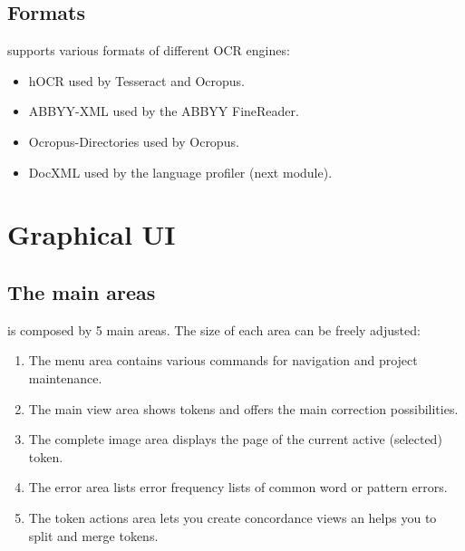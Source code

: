 \subsection{Formats}
\begin{frame}
	\pocoto{} supports various formats of different OCR engines:
	\begin{itemize}
		\item hOCR used by Tesseract and Ocropus.
		\item ABBYY-XML used by the ABBYY FineReader.
		\item Ocropus-Directories used by Ocropus.
		\item DocXML used by the language profiler (next module).
	\end{itemize}
\end{frame}

\section{Graphical UI}
\subsection{The main areas}
\begin{frame}
	\pocoto{} is composed by 5 main areas. The size of each area can be
	freely adjusted:
	\begin{enumerate}
		\item The menu area contains various commands for navigation and project
			maintenance.
		\item The main view area shows tokens and offers the main correction
			possibilities.
		\item The complete image area displays the page of the current active
			(selected) token.
		\item The error area lists error frequency lists of common word or
			pattern errors.
		\item The token actions area lets you create concordance views an helps
			you to split and merge tokens.
	\end{enumerate}
\end{frame}

